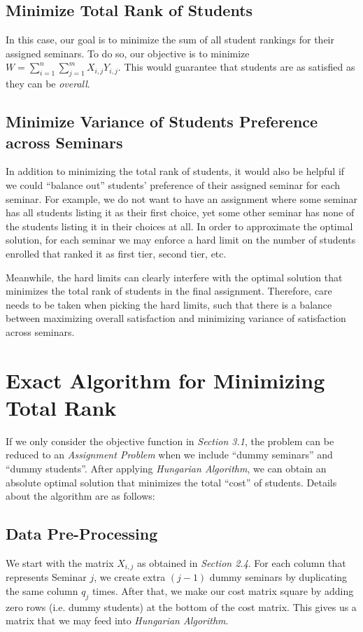 \documentclass{article} %
\begin{document}
\subsection{Minimize Total Rank of Students}
    \par\qquad In this case, our goal is to minimize the sum of all student rankings for their assigned seminars. To do so, our objective is to minimize $W = \sum_{i=1}^{n}{\sum_{j=1}^{m}{X_{i,j}Y_{i,j}}}$. This would guarantee that students are as satisfied as they can be \emph{overall}.

\subsection{Minimize Variance of Students Preference across Seminars}
    \par\qquad In addition to minimizing the total rank of students, it would also be helpful if we could ``balance out'' students' preference of their assigned seminar for each seminar. For example, we do not want to have an assignment where some seminar has all students listing it as their first choice, yet some other seminar has none of the students listing it in their choices at all. In order to approximate the optimal solution, for each seminar we may enforce a hard limit on the number of students enrolled that ranked it as first tier, second tier, etc.
    \par\qquad Meanwhile, the hard limits can clearly interfere with the optimal solution that minimizes the total rank of students in the final assignment. Therefore, care needs to be taken when picking the hard limits, such that there is a balance between maximizing overall satisfaction and minimizing variance of satisfaction across seminars.

%
%
%
\section{Exact Algorithm for Minimizing Total Rank}
    \par\qquad If we only consider the objective function in \emph{Section 3.1}, the problem can be reduced to an \emph{Assignment Problem} when we include ``dummy seminars'' and ``dummy students''. After applying \emph{Hungarian Algorithm}, we can obtain an absolute optimal solution that minimizes the total ``cost'' of students. Details about the algorithm are as follows:
    
\subsection{Data Pre-Processing}
    \par\qquad We start with the matrix $X_{i,j}$ as obtained in \emph{Section 2.4}. For each column that represents Seminar $j$, we create extra $(j-1)$ dummy seminars by duplicating the same column $q_j$ times. After that, we make our cost matrix square by adding zero rows (i.e. dummy students) at the bottom of the cost matrix. This gives us a matrix that we may feed into \emph{Hungarian Algorithm}.
\end{document}
